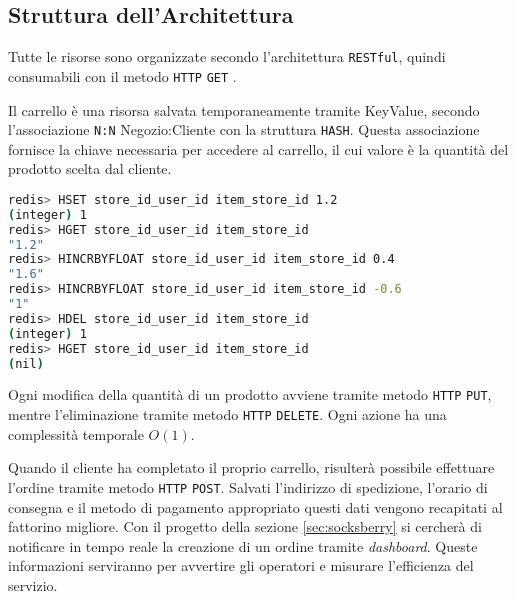 \subsection{Struttura dell'Architettura}
\label{subsec:supermercato24StrutturaArchitettura}

Tutte le risorse sono organizzate secondo l'architettura \verb+RESTful+, quindi consumabili con il metodo \verb+HTTP+ \verb+GET+ \cite{Rest}.

Il carrello è una risorsa salvata temporaneamente tramite KeyValue, secondo l'associazione \verb+N:N+ Negozio:Cliente con la struttura \verb+HASH+.
Questa associazione fornisce la chiave necessaria per accedere al carrello, il cui valore è la quantità del prodotto scelta dal cliente.

\begin{lstlisting}[language=bash, label={lst:supermercato24Architettura}, captionpos=b, caption={Elenco dell'operazioni effettuate nel carrello da parte del cliente}, basicstyle=\scriptsize\ttfamily]
redis> HSET store_id_user_id item_store_id 1.2
(integer) 1
redis> HGET store_id_user_id item_store_id
"1.2"
redis> HINCRBYFLOAT store_id_user_id item_store_id 0.4
"1.6"
redis> HINCRBYFLOAT store_id_user_id item_store_id -0.6
"1"
redis> HDEL store_id_user_id item_store_id
(integer) 1
redis> HGET store_id_user_id item_store_id
(nil)
\end{lstlisting}

Ogni modifica della quantità di un prodotto avviene tramite metodo \verb+HTTP+ \verb+PUT+, mentre l'eliminazione tramite metodo \verb+HTTP+ \verb+DELETE+.
Ogni azione ha una complessità temporale $O(1)$.

Quando il cliente ha completato il proprio carrello, risulterà possibile effettuare l'ordine tramite metodo \verb+HTTP+ \verb+POST+.
Salvati l'indirizzo di spedizione, l'orario di consegna e il metodo di pagamento appropriato questi dati vengono recapitati al fattorino migliore.
Con il progetto della sezione \ref{sec:socksberry} si cercherà di notificare in tempo reale la creazione di un ordine tramite \textit{dashboard}.
Queste informazioni serviranno per avvertire gli operatori e misurare l'efficienza del servizio.
